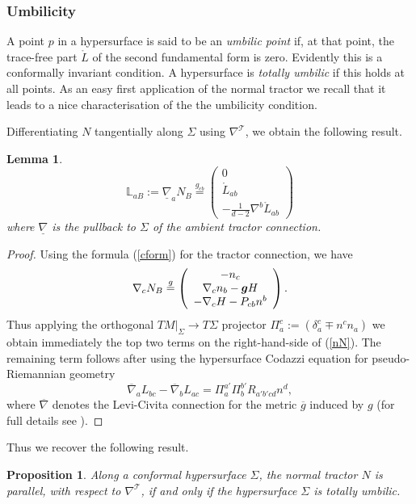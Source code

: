 \documentclass[a4paper,12pt]{amsart}
\newcommand{\cT}{{\mathcal T}}
\def\bg{\mbox{\boldmath $g$}}
\newtheorem{lemma}[theorem]{Lemma}
\newtheorem{proposition}[theorem]{Proposition}
\theoremstyle{remark}
\newcommand{\nn}[1]{(\ref{#1})}
\newcommand{\nd}{\nabla}
\begin{document}
\subsubsection{Umbilicity} 
A point $p$ in a hypersurface is said to be an {\em umbilic point} if,
at that point, the trace-free part $\mathring{L}$ of the second
fundamental form is zero. Evidently this is a conformally invariant
condition.  A hypersurface is {\em totally umbilic} if this holds at
all points.  As an easy first application of the normal tractor we
recall that it leads to a nice characterisation of the the umbilicity
condition.


Differentiating $N$ tangentially along $\Sigma$ using
$\nd^\cT$, we obtain the following result. 
\begin{lemma}
\begin{equation}\label{nN}
\mathbb{L}_{aB}:=\underline{\nabla}_a N_B \stackrel{g_{cb}}{=} \left(\begin{array}{c}0\\
\mathring{L}_{ab}\\
-\frac{1}{d-2}\nabla^b\mathring{L}_{ab} \end{array}\right)
\end{equation}
where $\underline{\nabla}$ is the pullback to
$\Sigma$ of the ambient tractor connection.
\end{lemma}
\begin{proof}
Using the formula \nn{cform} for the
tractor connection, we have
$$
\nabla_c N_B \stackrel{g}{=} \left(\begin{array}{c} -n_c \\
\nabla_c n_b-\bg H\\
-\nabla_c H -P_{cb}n^b  \end{array}\right).
$$ 
Thus applying the orthogonal $TM|_\Sigma \to T\Sigma$
 projector $\Pi^c_a:=(\delta^c_a\mp n^cn_a)$ we
obtain immediately the top two terms on the right-hand-side of
\nn{nN}. The remaining term follows after using the hypersurface 
Codazzi equation for pseudo-Riemannian geometry
$$
\overline{\nabla}_a L_{bc} - \overline{\nabla}_b L_{ac}
= \Pi^{a'}_a \Pi^{b'}_b R_{a'b'cd}n^d,
$$ 
where $\overline{\nabla}$ denotes the Levi-Civita connection for the metric $\overline{g}$ induced by $g$ (for full details see \cite{YuriTh,GoY}).  
\end{proof}
Thus we recover the following result.
\begin{proposition}\label{umbilic}\cite{BEG}
Along a conformal hypersurface $\Sigma$, the normal tractor $N$ is parallel, with respect to $\nabla^{\cT}$,
if and only if  the hypersurface $\Sigma$ is
totally umbilic.
\end{proposition}
\end{document}
